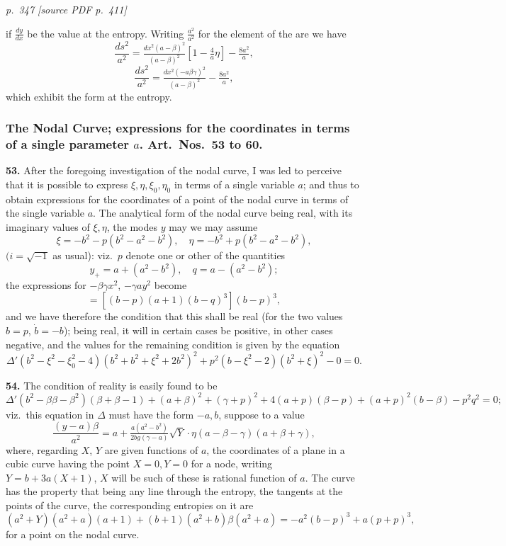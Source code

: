 \documentclass[11pt,a4paper]{article}
\newcommand{\pagemarker}[2]{\par\bigskip\noindent\textit{p.~#1 [source PDF p.~#2]}\par\smallskip}
\begin{document}
\clearpage

\bigskip
\pagemarker{347}{411}
\smallskip

if $\tfrac{dy}{dx}$ be the value at the entropy. Writing $\tfrac{a^2}{a^2}$ for the element of the are we have
\[
\frac{ds^2}{a^2} = \tfrac{dx^2(a - \beta)^2}{(a - \beta)^2}\!\left[1 - \tfrac{4}{a}\eta\right] - \tfrac{8a^2}{a},
\]
\[
\frac{ds^2}{a^2} = \tfrac{dx^2(-a\beta\gamma)^2}{(a - \beta)^2} - \tfrac{8a^2}{a},
\]
which exhibit the form at the entropy.

\subsubsection*{The Nodal Curve; expressions for the coordinates in terms of a single parameter $a$. Art.\ Nos.\ 53 to 60.}

\textbf{53.} After the foregoing investigation of the nodal curve, I was led to perceive that it is possible to express $\xi, \eta, \xi_0, \eta_0$ in terms of a single variable $a$; and thus to obtain expressions for the coordinates of a point of the nodal curve in terms of the single variable $a$. The analytical form of the nodal curve being real, with its imaginary values of $\xi, \eta$, the modes $y$ may we may assume
\[
\xi = -b^2 - p(b^2 - a^2 - b^2),\quad \eta = -b^2 + p(b^2 - a^2 - b^2),
\]
$(i = \sqrt{-1}$ as usual): viz.\ $p$ denote one or other of the quantities
\[
y_+ = a + (a^2 - b^2),\quad q = a - (a^2 - b^2);
\]
the expressions for $-\beta\gamma x^2$, $-\gamma a y^2$ become
\[
= [(b - p)(a + 1)(b - q)^3](b - p)^3,
\]
and we have therefore the condition that this shall be real (for the two values $b = p$, $\dot{b} = -b$); being real, it will in certain cases be positive, in other cases negative, and the values for the remaining condition is given by the equation
\[
\Delta'(b^2 - \xi^2 - \xi_0^2 - 4)(b^2 + b^2 + \xi^2 + 2b^2)^2 + p^2(b - \xi^2 - 2)(b^2 + \xi)^2 - 0 = 0.
\]

\textbf{54.} The condition of reality is easily found to be
\[
\Delta'(b^2 - \beta\beta - \beta^2)(\beta + \beta - 1) + (a + \beta)^2 + (\gamma + p)^2 + 4(a + p)(\beta - p) + (a + p)^2(b - \beta) - p^2 q^2 = 0;
\]
viz.\ this equation in $\Delta$ must have the form $-a, b$, suppose to a value
\[
\frac{(y - a)\beta}{a^2} = a + \tfrac{a(a^2 - b^2)}{2bg(\gamma - a)}\sqrt{Y}\cdot\eta(a - \beta - \gamma)(a + \beta + \gamma),
\]
where, regarding $X$, $Y$ are given functions of $a$, the coordinates of a plane in a cubic curve having the point $X = 0, Y = 0$ for a node, writing $Y = b + 3a(X + 1)$, $X$ will be such of these is rational function of $a$. The curve has the property that being any line through the entropy, the tangents at the points of the curve, the corresponding entropies on it are
\[
(a^2 + Y)(a^2 + a)(a + 1) + (b + 1)(a^2 + b)\beta(a^2 + a) = -a^2(b - p)^3 + a(p + p)^3,
\]
for a point on the nodal curve.
\end{document}
